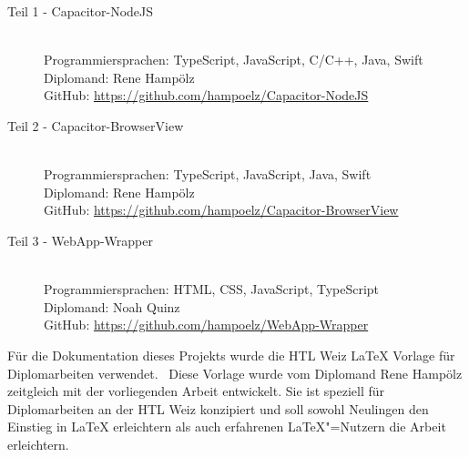
\begin{description}
  \item[Teil 1 - Capacitor-NodeJS] \hfill\\
  Programmiersprachen: TypeScript, JavaScript, C/C++, Java, Swift\\
  Diplomand: Rene Hampölz\\
  GitHub: \href{https://github.com/hampoelz/Capacitor-NodeJS}{https://github.com/hampoelz/Capacitor-NodeJS}
  \item[Teil 2 - Capacitor-BrowserView] \hfill\\
  Programmiersprachen: TypeScript, JavaScript, Java, Swift\\
  Diplomand: Rene Hampölz\\
  GitHub: \href{https://github.com/hampoelz/Capacitor-BrowserView}{https://github.com/hampoelz/Capacitor-BrowserView}
  \item[Teil 3 - WebApp-Wrapper] \hfill\\
  Programmiersprachen: HTML, CSS, JavaScript, TypeScript\\
  Diplomand: Noah Quinz\\
  GitHub: \href{https://github.com/hampoelz/WebApp-Wrapper}{https://github.com/hampoelz/WebApp-Wrapper}
\end{description}

\begin{note}
  Für die Dokumentation dieses Projekts wurde die HTL Weiz LaTeX Vorlage für Diplomarbeiten verwendet.~\cite{template:latex} Diese Vorlage wurde vom Diplomand Rene Hampölz zeitgleich mit der vorliegenden Arbeit entwickelt.
  Sie ist speziell für Diplomarbeiten an der HTL Weiz konzipiert und soll sowohl Neulingen den Einstieg in LaTeX erleichtern als auch erfahrenen LaTeX"=Nutzern die Arbeit erleichtern.
\end{note}

\printChangelog
